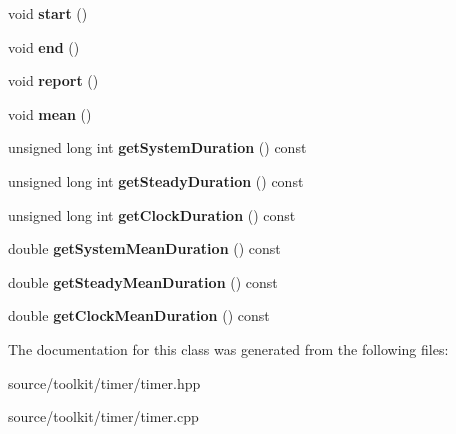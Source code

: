 \begin{DoxyCompactItemize}
\item 
\mbox{\label{classTimer_a3a8b5272198d029779dc9302a54305a8}} 
void {\bfseries start} ()
\item 
\mbox{\label{classTimer_accef2f2b25869fbca2947a56b494d2a0}} 
void {\bfseries end} ()
\item 
\mbox{\label{classTimer_ab639c59072f1af668e8f0b01899fbed5}} 
void {\bfseries report} ()
\item 
\mbox{\label{classTimer_af28858556e8ac4c505468d1210a49d15}} 
void {\bfseries mean} ()
\item 
\mbox{\label{classTimer_a37f089d8b5970b158a6c5baf32af97ff}} 
unsigned long int {\bfseries get\+System\+Duration} () const
\item 
\mbox{\label{classTimer_ac0cd8e22bfc95867b338823070f92a15}} 
unsigned long int {\bfseries get\+Steady\+Duration} () const
\item 
\mbox{\label{classTimer_a4fc31127385ed78ebdffdca74a413031}} 
unsigned long int {\bfseries get\+Clock\+Duration} () const
\item 
\mbox{\label{classTimer_aab9798318623059d27f162f939ee05cc}} 
double {\bfseries get\+System\+Mean\+Duration} () const
\item 
\mbox{\label{classTimer_a07ab142e471658f501d819e5e2f79c51}} 
double {\bfseries get\+Steady\+Mean\+Duration} () const
\item 
\mbox{\label{classTimer_ab7138d14080899b72dff68a187e4b584}} 
double {\bfseries get\+Clock\+Mean\+Duration} () const
\end{DoxyCompactItemize}


The documentation for this class was generated from the following files\+:\begin{DoxyCompactItemize}
\item 
source/toolkit/timer/timer.\+hpp\item 
source/toolkit/timer/timer.\+cpp\end{DoxyCompactItemize}
